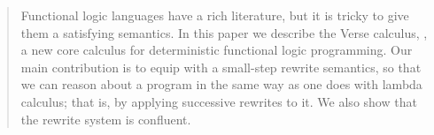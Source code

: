 \documentclass[acmsmall]{acmart}
\begin{document}
\begin{abstract}
  Functional logic languages have a rich literature, but it is tricky
  to give them a satisfying semantics.  In this paper we describe the
  Verse calculus, \versecalc{}, a new core calculus for deterministic functional
  logic programming. Our main contribution is to equip \versecalc{} with a
  small-step rewrite semantics, so that we can reason
  about a \versecalc{} program in the same way as one does with lambda
  calculus; that is, by applying successive rewrites to it.
  We also show that the rewrite system is confluent.
  \par
  \vspace{1em}
\end{abstract}
\end{document}
